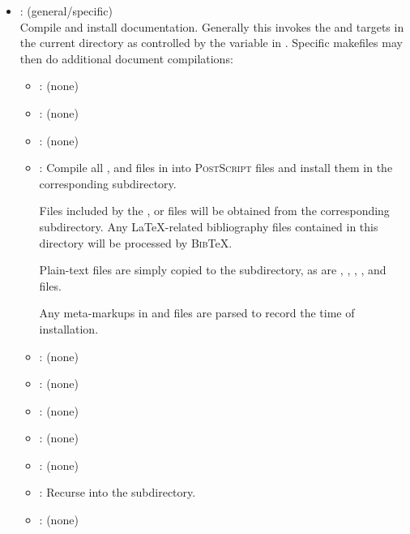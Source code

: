 \begin{itemize}
\item
    : (general/specific)
   \\ Compile and install documentation.  Generally this invokes the
    and  targets in the current directory as
   controlled by the  variable in .  Specific
   makefiles may then do additional document compilations:
   \begin{itemize}
   \item
      : (none)
   \item
      : (none)
   \item
      : (none)
   \item
      : Compile all ,  and 
      files in  into  \textsc{PostScript} files
      and install them in the corresponding  subdirectory.

      Files included by the ,  or 
      files will be obtained from the corresponding  subdirectory.
      Any \LaTeX-related  bibliography files contained in
      this directory will be processed by \textsc{Bib}\TeX.

      Plain-text  files are simply copied to the 
      subdirectory, as are , , ,
      , and  files.

      Any  meta-markups in  and 
      files are parsed to record the time of installation.
   \item
      : (none)
   \item
      : (none)
   \item
      : (none)
   \item
      : (none)
   \item
      : (none)
   \item
      : Recurse into the  subdirectory.
   \item
      : (none)
   \end{itemize}


\end{itemize}
